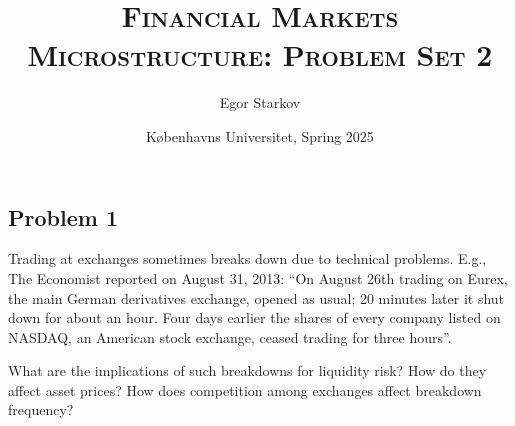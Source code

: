 \documentclass[11pt
, answers
]{exam}
\begin{document}
	
	
\title{\textsc{Financial Markets Microstructure: Problem Set 2}}
\date{K{\o}benhavns Universitet, Spring 2025}
\author{Egor Starkov}


\maketitle



\quad


\subsection*{Problem 1}

Trading at exchanges sometimes breaks down due to technical problems. E.g., The Economist reported on August 31, 2013: ``On August 26th trading on Eurex, the main German derivatives exchange, opened as usual; 20 minutes later it shut down for about an hour. Four days earlier the shares of every company listed on NASDAQ, an American stock exchange, ceased trading for three hours''. 

What are the implications of such breakdowns for liquidity risk? How do they affect asset prices? How does competition among exchanges affect breakdown frequency?
\end{document}
